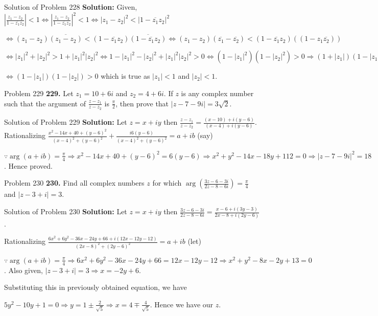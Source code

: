\documentclass[aspectratio=169,8pt]{beamer}
\begin{document}
\begin{frame}{Solution of Problem 228}
  \textbf{Solution:} Given, $\left|\frac{z_1 - z_2}{1 - \overline{z_1}z_2}\right|< 1\Leftrightarrow
  \left|\frac{z_1 - z_2}{1 - \overline{z_1}z_2}\right|^2 < 1 \Leftrightarrow |z_1 - z_2|^2 < |1 -
  \overline{z_1}z_2|^2$

  $\Leftrightarrow (z_1 - z_2)\overline{(z_1 - z_2)} < (1 - \overline{z_1}z_2)\overline{(1 -
  \overline{z_1}z_2)} \Leftrightarrow (z_1 - z_2)(\overline{z_1} - \overline{z_2}) < (1 -
  \overline{z_1}z_2)((1 - z_1\overline{z_2}))$

  $\Leftrightarrow |z_1|^2 + |z_2|^2 > 1 + |z_1|^2|z_2|^2 \Leftrightarrow 1 - |z_1|^2 - |z_2|^2 +
  |z_1|^2|z_2|^2 > 0 \Leftrightarrow (1 - |z_1|^2)(1 - |z_2|^2) > 0 \Rightarrow (1 + |z_1|)(1 - |z_1|)(1 +
  |z_2|)(1 - |z_2|) > 0$

  $\Leftrightarrow (1 - |z_1|)(1 - |z_2|) > 0$ which is true as $|z_1| < 1$ and $|z_2| < 1$.
\end{frame}
\begin{frame}{Problem 229}
  \textbf{229.} Let $z_1 = 10 + 6i$ and $z_2 = 4 + 6i$. If $z$ is any complex number such that the argument
  of $\frac{z - z_1}{z - z_2}$ is $\frac{\pi}{2}$, then prove that $|z - 7 - 9i| = 3\sqrt{2}$.
\end{frame}
\begin{frame}{Solution of Problem 229}
  \textbf{Solution:} Let $z = x + iy$ then $\frac{z - z_1}{z - z_2} = \frac{(x - 10) + i(y - 6)}{(x - 4) +
    i(y - 6)}$. Rationalizing $\frac{x^2 - 14x + 40 + (y - 6)^2}{(x - 4)^2 + (y - 6)^2} + \frac{i6(y -
    6)}{(x - 4)^2 + (y - 6)^2} = a + ib$ (say)

  $\because \arg(a + ib) = \frac{\pi}{4}\Rightarrow x^2 - 14x + 40 + (y - 6)^2 = 6(y - 6)\Rightarrow x^2 +
  y^2 - 14x - 18y + 112 = 0 \Rightarrow |z - 7 - 9i|^2 = 18$. Hence proved.
\end{frame}
\begin{frame}{Problem 230}
  \textbf{230.} Find all complex numbers $z$ for which $\arg\left(\frac{3z - 6 - 3i}{2z - 8 - 6i}\right) =
  \frac{\pi}{4}$ and $|z - 3 + i| = 3$.
\end{frame}
\begin{frame}{Solution of Problem 230}
  \textbf{Solution:} Let $z = x + iy$ then $\frac{3z - 6 - 3i}{2z - 8 - 6i} = \frac{x - 6 + i(3y - 3)}{2x -
    8 + i(2y - 6)}$.

  Rationalizing $\frac{6x^2 + 6y^2 - 36x - 24y + 66 + i(12x - 12y - 12)}{(2x - 8)^2 + (2y
    - 6)^2} = a + ib$ (let)

  $\because\arg(a + ib) = \frac{\pi}{4} \Rightarrow 6x^2 + 6y^2 - 36x - 24y + 66 = 12x - 12y - 12
  \Rightarrow x^2 + y^2 - 8x - 2y + 13 = 0$. Also given, $|z - 3 + i| = 3 \Rightarrow x = -2y +
  6$.

  Substituting this in previously obtained equation, we have

  $5y^2 - 10y + 1 = 0 \Rightarrow y = 1 \pm\frac{2}{\sqrt{5}}\Rightarrow x = 4\mp\frac{4}{\sqrt{5}}$. Hence
  we have our $z$.
\end{frame}
\end{document}
